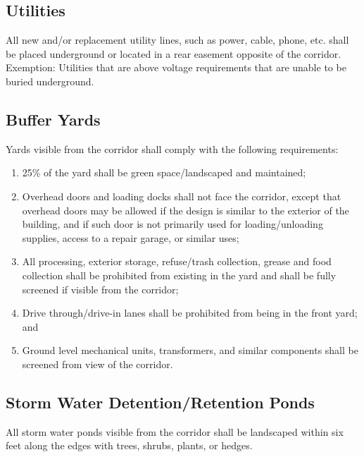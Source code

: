 \subsection{Utilities}
All new and/or replacement  utility lines, such as power, cable, phone, etc. shall be placed underground or located in a rear easement opposite of the corridor. Exemption: Utilities that are above voltage requirements that are unable to be buried underground.
\subsection{Buffer Yards}
Yards visible from the corridor shall comply with the following requirements:
\begin{enumerate}[{\indent}1)]
    \item 25\% of the yard shall be green space/landscaped and maintained;
    \item Overhead doors and loading docks shall not face the corridor, except that overhead doors may be allowed if the design is similar to the exterior of the building, and if such door is not primarily used for loading/unloading supplies, access to a repair garage, or similar uses;
    \item All processing, exterior storage, refuse/trash collection, grease and food collection shall be prohibited from existing in the yard and shall be fully screened if visible from the corridor;
    \item Drive through/drive-in lanes shall be prohibited from being in the front yard; and
    \item Ground level mechanical units, transformers, and similar components shall be screened from view of the corridor.
\end{enumerate}
\subsection{Storm Water Detention/Retention Ponds}
All storm water ponds visible from the corridor shall be landscaped within six feet along the edges with trees, shrubs, plants, or hedges.

